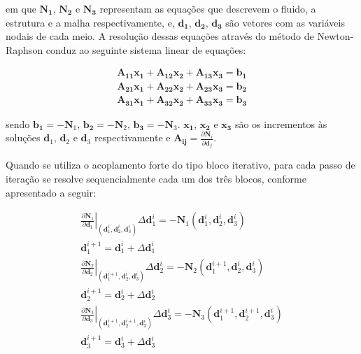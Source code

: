 \documentclass[tese_patricia]{subfiles}
\begin{document}
\noindent em que $\mathbf{{N}_{1}}$, $\mathbf{{N}_{2}}$ e $\mathbf{{N}_{3}}$ representam as equações que descrevem o fluido, a estrutura e a malha respectivamente, e, $\mathbf{{d}_{1}}$, $\mathbf{{d}_{2}}$, $\mathbf{{d}_{3}}$ são vetores com as variáveis nodais de cada meio. 
A resolução dessas equações através do método de Newton-Raphson conduz ao seguinte sistema linear de equações:

\begin{align}
\mathbf{A_{11}}\mathbf{x_{1}} + \mathbf{A_{12}}\mathbf{x_{2}} + \mathbf{A_{13}}\mathbf{x_{3}} = \mathbf{b_{1}}\\
\mathbf{A_{21}}\mathbf{x_{1}} + \mathbf{A_{22}}\mathbf{x_{2}} + \mathbf{A_{23}}\mathbf{x_{3}} = \mathbf{b_{2}}\\
\mathbf{A_{31}}\mathbf{x_{1}} + \mathbf{A_{32}}\mathbf{x_{2}} + \mathbf{A_{33}}\mathbf{x_{3}} = \mathbf{b_{3}}
\end{align}

\noindent sendo $\mathbf{b_{1}} = - \mathbf{N}_{1}$, $\mathbf{b_{2}} = - \mathbf{N}_{2}$, $\mathbf{b_{3}} = - \mathbf{N}_{3}$. $\mathbf{x_{1}}$, $\mathbf{x_{2}}$ e $\mathbf{x_{3}}$ são os incrementos às soluções $\mathbf{d}_{1}$, $\mathbf{d}_{2}$ e $\mathbf{d}_{3}$ respectivamente e $\mathbf{A_{ij}} = \frac{\partial\mathbf{N}_{i}}{\partial\mathbf{d}_{j}}$. 

Quando se utiliza o acoplamento forte do tipo bloco iterativo, para cada passo de iteração se resolve sequencialmente cada um dos três blocos, conforme apresentado a seguir:


\begin{align}
	\left .\frac{\partial\mathbf{N}_{1}}{\partial\mathbf{d}_{1}}\right|_{\left(\mathbf{d}_{1}^{i},\mathbf{d}_{2}^{i},\mathbf{d}_{3}^{i}\right)} \Delta\mathbf{d}_{1}^{i} = - \mathbf{N}_{1}\left(\mathbf{d}_{1}^{i},\mathbf{d}_{2}^{i},\mathbf{d}_{3}^{i}\right)  \label{eq:Fluido} \\
	\mathbf{d}_{1}^{i+1} =  \mathbf{d}_{1}^{i} + \Delta\mathbf{d}_{1}^{i} \label{eq:upFluido}	\\
	\left.\frac{\partial\mathbf{N}_{2}}{\partial\mathbf{d}_{2}}\right|_{\left(\mathbf{d}_{1}^{i+1},\mathbf{d}_{2}^{i},\mathbf{d}_{3}^{i}\right)} \Delta\mathbf{d}_{2}^{i} = - \mathbf{N}_{2}\left(\mathbf{d}_{1}^{i+1},\mathbf{d}_{2}^{i},\mathbf{d}_{3}^{i}\right) \label{eq:Estrutura}\\
	\mathbf{d}_{2}^{i+1} =  \mathbf{d}_{2}^{i} + \Delta\mathbf{d}_{2}^{i} \label{eq:upEstrutura}\\
	\left.\frac{\partial\mathbf{N}_{3}}{\partial\mathbf{d}_{3}}\right|_{\left(\mathbf{d}_{1}^{i+1},\mathbf{d}_{2}^{i+1},\mathbf{d}_{3}^{i}\right)} \Delta\mathbf{d}_{3}^{i} = - \mathbf{N}_{3}\left(\mathbf{d}_{1}^{i+1},\mathbf{d}_{2}^{i+1},\mathbf{d}_{3}^{i}\right) \label{eq:Malha}\\
	\mathbf{d}_{3}^{i+1} =  \mathbf{d}_{3}^{i} + \Delta\mathbf{d}_{3}^{i}  \label{eq:upMalha}
\end{align}
\end{document}
